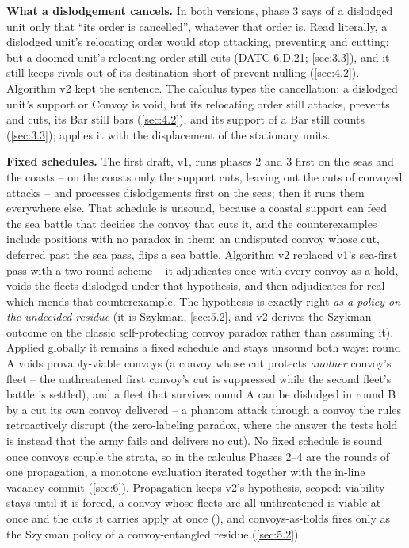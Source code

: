 \documentclass[12pt,a4paper]{article}
\begin{document}
 \textbf{What a dislodgement cancels.}
In both versions, phase 3 says of a dislodged unit only that ``its order is cancelled'', whatever that order is.
Read literally, a dislodged unit's relocating order would stop attacking, preventing and cutting; but a doomed unit's relocating order still cuts (DATC 6.D.21; \cref{sec:3.3}), and it still keeps rivals out of its destination short of prevent-nulling (\cref{sec:4.2}).
Algorithm v2 kept the sentence.
The calculus types the cancellation: a dislodged unit's support or Convoy is void, but its relocating order still attacks, prevents and cuts, its Bar still bars (\cref{sec:4.2}), and its support of a Bar still counts (\cref{sec:3.3});  applies it with the displacement of the stationary units.

 \textbf{Fixed schedules.}
The first draft, v1, runs phases 2 and 3 first on the seas and the coasts -- on the coasts only the support cuts, leaving out the cuts of convoyed attacks -- and processes dislodgements first on the seas; then it runs them everywhere else.
That schedule is unsound, because a coastal support can feed the sea battle that decides the convoy that cuts it, and the counterexamples include positions with no paradox in them: an undisputed convoy whose cut, deferred past the sea pass, flips a sea battle.
Algorithm v2 replaced v1's sea-first pass with a two-round scheme -- it adjudicates once with every convoy as a hold, voids the fleets dislodged under that hypothesis, and then adjudicates for real -- which mends that counterexample.
The hypothesis is exactly right \emph{as a policy on the undecided residue} (it is Szykman, \cref{sec:5.2}, and v2 derives the Szykman outcome on the classic self-protecting convoy paradox rather than assuming it).
Applied globally it remains a fixed schedule and stays unsound both ways: round A voids provably-viable convoys (a convoy whose cut protects \emph{another} convoy's fleet -- the unthreatened first convoy's cut is suppressed while the second fleet's battle is settled), and a fleet that survives round A can be dislodged in round B by a cut its own convoy delivered -- a phantom attack through a convoy the rules retroactively disrupt (the zero-labeling paradox, where the answer the tests hold is instead that the army fails and delivers no cut).
No fixed schedule is sound once convoys couple the strata, so in the calculus Phases 2--4 are the rounds of one propagation, a monotone evaluation iterated together with the in-line vacancy commit (\cref{sec:6}).
Propagation keeps v2's hypothesis, scoped: viability stays  until it is forced, a convoy whose fleets are all unthreatened is viable at once and the cuts it carries apply at once (), and convoys-as-holds fires only as the Szykman policy of a convoy-entangled residue (\cref{sec:5.2}).
\end{document}
